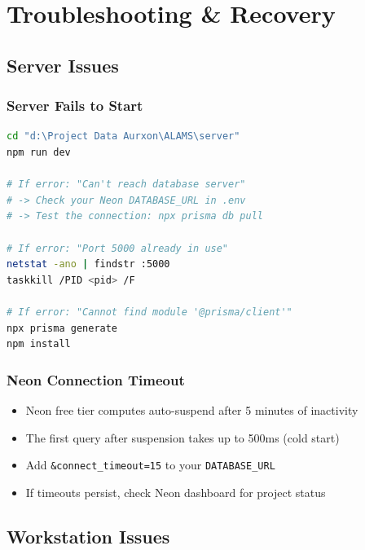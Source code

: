 \chapter{Troubleshooting \& Recovery}
\label{ch:troubleshooting}

\section{Server Issues}

\subsection{Server Fails to Start}

\begin{tcolorbox}[codebox, title={Diagnose Startup Errors}]
\begin{lstlisting}[language=bash]
cd "d:\Project Data Aurxon\ALAMS\server"
npm run dev

# If error: "Can't reach database server"
# -> Check your Neon DATABASE_URL in .env
# -> Test the connection: npx prisma db pull

# If error: "Port 5000 already in use"
netstat -ano | findstr :5000
taskkill /PID <pid> /F

# If error: "Cannot find module '@prisma/client'"
npx prisma generate
npm install
\end{lstlisting}
\end{tcolorbox}

\subsection{Neon Connection Timeout}

\begin{itemize}[label={\textcolor{aurxonamber}{\faExclamationTriangle}}]
  \item Neon free tier computes auto-suspend after 5 minutes of inactivity
  \item The first query after suspension takes up to 500ms (cold start)
  \item Add \texttt{\&connect\_timeout=15} to your \texttt{DATABASE\_URL}
  \item If timeouts persist, check Neon dashboard for project status
\end{itemize}

\section{Workstation Issues}

